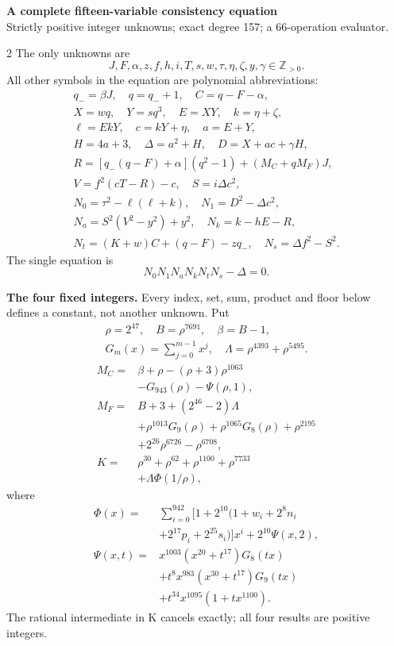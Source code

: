 \documentclass[10pt]{article}
\begin{document}
\begin{center}
{\large\bfseries A complete fifteen-variable consistency equation}\\[-1pt]
{\small Strictly positive integer unknowns; exact degree 157; a 66-operation evaluator.}
\end{center}\vspace{-8pt}
\begin{multicols}{2}
\fontsize{9}{9.5}\selectfont
The only unknowns are
\[
J,F,\alpha,z,f,h,i,T,s,w,\tau,\eta,\zeta,y,\gamma\in\mathbb Z_{>0}.
\]
All other symbols in the equation are polynomial abbreviations:
\[
\begin{gathered}
q_-=\beta J,\quad q=q_-+1,\quad C=q-F-\alpha,\\
X=wq,\quad Y=sq^3,\quad E=XY,\quad k=\eta+\zeta,\\
\ell=EkY,\quad c=kY+\eta,\quad a=E+Y,\\
H=4a+3,\quad\Delta=a^2+H,\quad D=X+ac+\gamma H,\\
R=[q_-(q-F)+\alpha](q^2-1)+(M_C+qM_F)J,\\
V=f^2(cT-R)-c,\quad S=i\Delta c^2,\\
N_0=\tau^2-\ell(\ell+k),\quad N_1=D^2-\Delta c^2,\\
N_a=S^2(V^2-y^2)+y^2,\quad N_k=k-hE-R,\\
N_t=(K+w)C+(q-F)-zq_-,\quad N_s=\Delta f^2-S^2.
\end{gathered}
\]
The single equation is
\[
\boxed{N_0N_1N_aN_kN_tN_s-\Delta=0.}
\]

\textbf{The four fixed integers.}
Every index, set, sum, product and floor below defines a constant, not
another unknown. Put
\[
\begin{gathered}
\rho=2^{47},\quad B=\rho^{7691},\quad\beta=B-1,\\
G_m(x)=\sum_{j=0}^{m-1}x^j,\quad
\Lambda=\rho^{4393}+\rho^{5495}.
\end{gathered}
\]
\begin{align*}
M_C={}&\beta+\rho-(\rho+3)\rho^{1063}\\
&-G_{943}(\rho)-\Psi(\rho,1),\\
M_F={}&B+3+(2^{46}-2)\Lambda\\
&+\rho^{1013}G_9(\rho)+\rho^{1065}G_8(\rho)
  +\rho^{2195}\\
&+2^{26}\rho^{6726}-\rho^{6708},\\
K={}&\rho^{30}+\rho^{62}+\rho^{1100}+\rho^{7733}\\
&+\Lambda\Phi(1/\rho),
\end{align*}
where
\[
\begin{split}
\Phi(x)={}&\sum_{i=0}^{942}[1+2^{10}(1+w_i+2^8n_i\\
&+2^{17}p_i+2^{25}s_i)]x^i+2^{10}\Psi(x,2),\\
\Psi(x,t)={}&x^{1003}(x^{20}+t^{17})G_8(tx)\\
&+t^8x^{983}(x^{30}+t^{17})G_9(tx)\\
&+t^{34}x^{1095}(1+tx^{1100}).
\end{split}
\]
The rational intermediate in K cancels exactly; all four results are positive integers.


\end{multicols}
\end{document}
